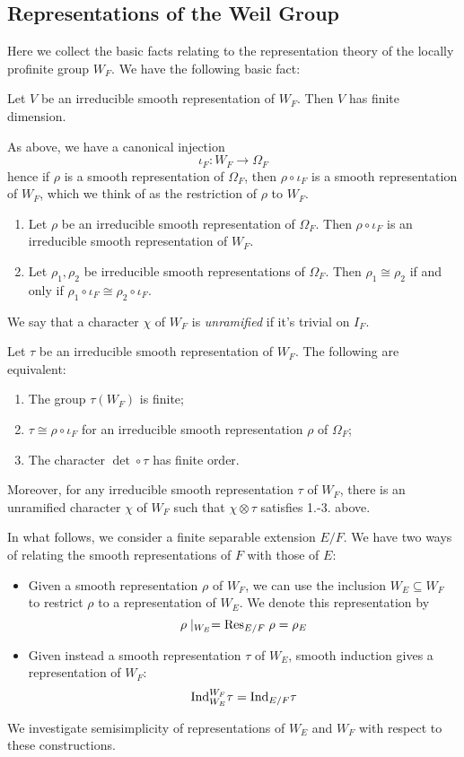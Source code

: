 \subsection{Representations of the Weil Group}
Here we collect the basic facts relating to the representation theory of the locally profinite group $W_F$. We have the following basic fact:
\begin{lemma}
	Let $V$ be an irreducible smooth representation of $W_F$. Then $V$ has finite dimension.
\end{lemma}
As above, we have a canonical injection
\[\iota_F: W_F\to \Omega_F\]
hence if $\rho$ is a smooth representation of $\Omega_F$, then $\rho\circ \iota_F$ is a smooth representation of $W_F$, which we think of as the restriction of $\rho$ to $W_F$. 
\begin{lemma}
\begin{enumerate}
	\item Let $\rho$ be an irreducible smooth representation of $\Omega_F$. Then $\rho\circ \iota_F$ is an irreducible smooth representation of $W_F$.
	\item Let $\rho_1, \rho_2$ be irreducible smooth representations of $\Omega_F$. Then $\rho_1\cong \rho_2$ if and only if $\rho_1\circ \iota_F\cong \rho_2\circ\iota_F$. 
\end{enumerate}
\end{lemma}
We say that a character $\chi$ of $W_F$ is \emph{unramified} if it's trivial on $I_F$. 
\begin{prop}
	Let $\tau$ be an irreducible smooth representation of $W_F$. The following are equivalent:
	\begin{enumerate}
		\item The group $\tau(W_F)$ is finite;
		\item $\tau \cong \rho\circ\iota_F $ for an irreducible smooth representation $\rho$ of $\Omega_F$;
		\item The character $\det \circ \tau$ has finite order.
	\end{enumerate}
	Moreover, for any irreducible smooth representation $\tau$ of $W_F$, there is an unramified character $\chi$ of $W_F$ such that $\chi\otimes \tau$ satisfies 1.-3. above.
\end{prop}
In what follows, we consider a finite separable extension $E/F$. We have two ways of relating the smooth representations of $F$ with those of $E$:
\begin{itemize}
	\item Given a smooth representation $\rho$ of $W_F$, we can use the inclusion $W_E\subseteq W_F$ to restrict $\rho$ to a representation of $W_E$. We denote this representation by 
	\[\rho\mid_{W_E} = \mathrm{Res}_{E/F} \;\rho = \rho_E\]
	\item Given instead a smooth representation $\tau$ of $W_E$, smooth induction gives a representation of $W_F$:
	\[\mathrm{Ind}_{W_E}^{W_F}\tau = \mathrm{Ind}_{E/F} \tau\]
\end{itemize}
We investigate semisimplicity of representations of $W_E$ and $W_F$ with respect to these constructions.

